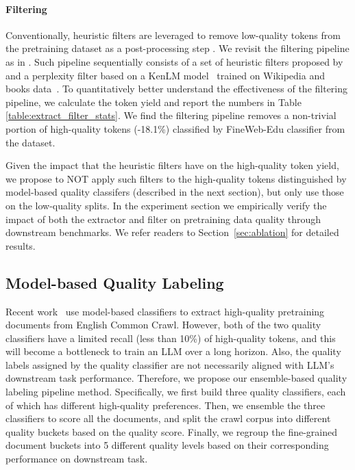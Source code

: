 \documentclass[11pt]{article}
\begin{document}
\paragraph{Filtering} Conventionally, heuristic filters are leveraged to remove low-quality tokens from the pretraining dataset as a post-processing step \citep{li2024datacomp,parmar2024data,penedo2024fineweb,dubey2024llama}. We revisit the filtering pipeline as in \citep{parmar2024data}. Such pipeline sequentially consists of a set of heuristic filters proposed by \citet{raffel2020exploring,rae2021scaling} and a perplexity filter based on a KenLM model~\citep{heafield2011kenlm} trained on Wikipedia and books data~\citep{wenzek-etal-2020-ccnet}. To quantitatively better understand the effectiveness of the filtering pipeline, we calculate the token yield and report the numbers in Table \ref{table:extract_filter_stats}. We find the filtering pipeline removes a non-trivial portion of high-quality tokens (-18.1\%) classified by FineWeb-Edu classifier from the dataset. 

Given the impact that the heuristic filters have on the high-quality token yield, we propose to NOT apply such filters to the high-quality tokens distinguished by model-based quality classifers (described in the next section), but only use those on the low-quality splits. In the experiment section we empirically verify the impact of both the extractor and filter on pretraining data quality through downstream benchmarks. We refer readers to Section~\ref{sec:ablation} for detailed results.

\subsection{Model-based Quality Labeling} \label{sec:classifier}
Recent work~\citep{li2024datacomp,penedo2024fineweb} use model-based classifiers to extract high-quality pretraining documents from English Common Crawl. However, both of the two quality classifiers have a limited recall (less than 10\%) of high-quality tokens, and this will become a bottleneck to train an LLM over a long horizon. Also, the quality labels assigned by the quality classifier are not necessarily aligned with LLM's downstream task performance. Therefore, we propose our ensemble-based quality labeling pipeline method. Specifically, we first build three quality classifiers, each of which has different high-quality preferences. Then, we ensemble the three classifiers to score all the documents, and split the crawl corpus into different quality buckets based on the quality score. Finally, we regroup the fine-grained document buckets into 5 different quality levels based on their corresponding performance on downstream task. 
\end{document}
